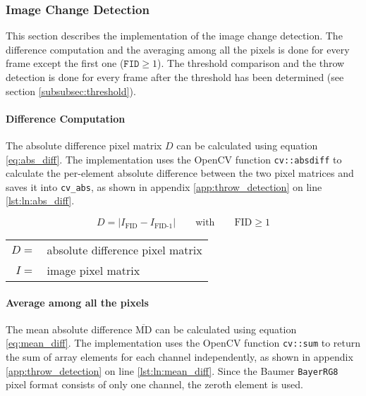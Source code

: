 \subsubsection{Image Change Detection}
\label{subsubsec:image_change_detection}

This section describes the implementation of the image change detection.
The difference computation and the averaging among all the pixels is done for every frame except the first one ($\texttt{FID} \geq 1$).
The threshold comparison and the throw detection is done for every frame after the threshold has been determined (see section \ref{subsubsec:threshold}).

\paragraph{Difference Computation}
The absolute difference pixel matrix $D$ can be calculated using equation \ref{eq:abs_diff}.
The implementation uses the OpenCV function \texttt{cv::absdiff} to calculate the per-element absolute difference between the two pixel matrices and saves it into \texttt{cv\_abs}, as shown in appendix \ref{app:throw_detection} on line \ref{lst:ln:abs_diff}.

\begin{equation}
  D = |I_\text{FID} - I_\text{FID-1}| \quad\quad \text{with} \quad\quad \text{FID} \geq 1
  \label{eq:abs_diff}
\end{equation}

\begin{tabular}{rl}
  $D =$ & absolute difference pixel matrix \\
  $I =$ & image pixel matrix \\
\end{tabular}

\paragraph{Average among all the pixels}
The mean absolute difference $\overline{\text{MD}}$ can be calculated using equation \ref{eq:mean_diff}.
The implementation uses the OpenCV function \texttt{cv::sum} to return the sum of array elements for each channel independently, as shown in appendix \ref{app:throw_detection} on line \ref{lst:ln:mean_diff}.
Since the Baumer \texttt{BayerRG8} pixel format consists of only one channel, the zeroth element is used.

